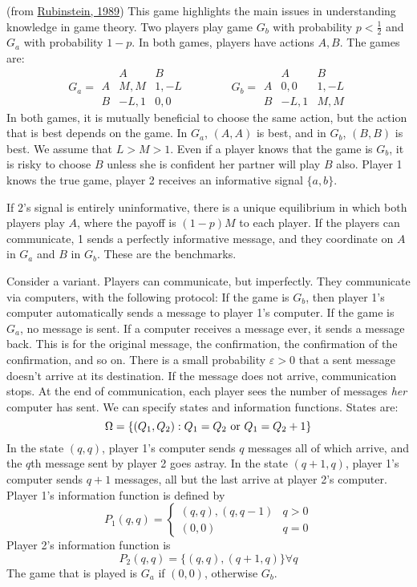 \documentclass[10pt]{article}
\begin{document}
\begin{model}
	 (from \href{https://arielrubinstein.tau.ac.il/papers/32.pdf}{Rubinstein, 1989}) This game highlights the main issues in understanding knowledge in game theory. Two players play game $G_b$ with probability $p < \frac{1}{2}$ and $G_a$ with probability $1-p$. In both games, players have actions $A,B$. The games are:
	\[G_a = \begin{array}{c|cc} & A & B \\\hline A & M,M & 1,-L \\ B & -L,1 & 0,0 \end{array}\qquad \qquad G_b =\begin{array}{c|cc} & A & B \\\hline A & 0,0 & 1,-L \\ B & -L,1 & M,M \end{array} \]In both games, it is mutually beneficial to choose the same action, but the action that is best depends on the game. In $G_a$, $(A,A)$ is best, and in $G_b$, $(B,B)$ is best. We assume that $L > M> 1$. Even if a player knows that the game is $G_b$, it is risky to choose $B$ unless she is confident her partner will play $B$ also. Player 1 knows the true game, player 2 receives an informative signal $\{a,b\}$. 
	
	If $2$'s signal is entirely uninformative, there is a unique equilibrium in which both players play $A$, where the payoff is $(1-p)M$ to each player. If the players can communicate, 1 sends a perfectly informative message, and they coordinate on $A$ in $G_a$ and $B$ in $G_b$. These are the benchmarks.
	
	Consider a variant. Players can communicate, but imperfectly. They communicate via computers, with the following protocol: If the game is $G_b$, then player 1's computer automatically sends a message to player 1's computer. If the game is $G_a$, no message is sent. If a computer receives a message ever, it sends a message back. This is for the original message, the confirmation, the confirmation of the confirmation, and so on. There is a small probability $\varepsilon > 0$ that a sent message doesn't arrive at its destination. If the message does not arrive, communication stops. At the end of communication, each player sees the number of messages \emph{her} computer has sent. We can specify states and information functions. States are:
	\[
	\Omega = \left\{ (Q_1,Q_2) : Q_1 = Q_2 \text{ or } Q_1 = Q_2 + 1\right\}
	\]
	In the state $(q,q)$, player 1's computer sends $q$ messages all of which arrive, and the $q$th message sent by player 2 goes astray. In the state $(q+1,q)$, player 1's computer sends $q+1$ messages, all but the last arrive at player 2's computer. Player 1's information function is defined by \[P_1(q,q) = \begin{cases} (q,q),(q,q-1) & q > 0 \\ (0,0) & q = 0\end{cases}\]Player 2's information function is \[P_2(q,q) = \{(q,q),(q+1,q)\} \forall q\]The game that is played is $G_a$ if $(0,0)$, otherwise $G_b$. 
	

\end{model}
\end{document}
